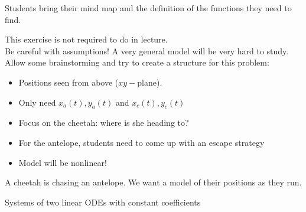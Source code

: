 \begin{annotation}
\begin{goals}
	Students bring their mind map and the definition of the functions they need to find.
\end{goals}	
\begin{goals}
		This exercise is not required to do in lecture. \\
		
		Be careful with assumptions! A very general model will be very hard to study. \\
		
		Allow some brainstorming and try to create a structure for this problem:
		\begin{itemize}
			\item Positions seen from above ($xy-$plane).
			\item Only need $x_a(t), y_a(t)$ and $x_c(t), y_c(t)$
			\item Focus on the cheetah: where is she heading to?
			\item For the antelope, students need to come up with an escape strategy
			\item Model will be nonlinear!
		\end{itemize}
	\end{goals}\end{annotation}
\question \label{sys:chase}
	A cheetah is chasing an antelope. We want a model of their positions as they run.
	
	




\standardonlynewpage

%
%



\begin{module}{Systems of two linear ODEs with constant coefficients}
	\label{sys:solve}

	
	
\end{module}



